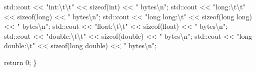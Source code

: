 \documentclass[
  letterpaper,
  DIV=11,
  numbers=noendperiod]{scrreprt}
\newenvironment{Shaded}{\begin{snugshade}}{\end{snugshade}}
\newcommand{\DecValTok}[1]{\textcolor[rgb]{0.68,0.00,0.00}{#1}}
\newcommand{\ErrorTok}[1]{\textcolor[rgb]{0.68,0.00,0.00}{#1}}
\newcommand{\FunctionTok}[1]{\textcolor[rgb]{0.28,0.35,0.67}{#1}}
\newcommand{\NormalTok}[1]{\textcolor[rgb]{0.00,0.23,0.31}{#1}}
\newcommand{\SpecialCharTok}[1]{\textcolor[rgb]{0.37,0.37,0.37}{#1}}
\newcommand{\StringTok}[1]{\textcolor[rgb]{0.13,0.47,0.30}{#1}}
\begin{document}
\begin{Shaded}
\begin{Highlighting}[]
\NormalTok{    std}\SpecialCharTok{::}\NormalTok{cout }\SpecialCharTok{\textless{}}\ErrorTok{\textless{}} \StringTok{"int:}\SpecialCharTok{\textbackslash{}t\textbackslash{}t}\StringTok{"} \SpecialCharTok{\textless{}}\ErrorTok{\textless{}} \FunctionTok{sizeof}\NormalTok{(int) }\SpecialCharTok{\textless{}}\ErrorTok{\textless{}} \StringTok{" bytes}\SpecialCharTok{\textbackslash{}n}\StringTok{"}\NormalTok{;}
\NormalTok{    std}\SpecialCharTok{::}\NormalTok{cout }\SpecialCharTok{\textless{}}\ErrorTok{\textless{}} \StringTok{"long:}\SpecialCharTok{\textbackslash{}t\textbackslash{}t}\StringTok{"} \SpecialCharTok{\textless{}}\ErrorTok{\textless{}} \FunctionTok{sizeof}\NormalTok{(long) }\SpecialCharTok{\textless{}}\ErrorTok{\textless{}} \StringTok{" bytes}\SpecialCharTok{\textbackslash{}n}\StringTok{"}\NormalTok{;}
\NormalTok{    std}\SpecialCharTok{::}\NormalTok{cout }\SpecialCharTok{\textless{}}\ErrorTok{\textless{}} \StringTok{"long long:}\SpecialCharTok{\textbackslash{}t}\StringTok{"} \SpecialCharTok{\textless{}}\ErrorTok{\textless{}} \FunctionTok{sizeof}\NormalTok{(long long) }\SpecialCharTok{\textless{}}\ErrorTok{\textless{}} \StringTok{" bytes}\SpecialCharTok{\textbackslash{}n}\StringTok{"}\NormalTok{;}
\NormalTok{    std}\SpecialCharTok{::}\NormalTok{cout }\SpecialCharTok{\textless{}}\ErrorTok{\textless{}} \StringTok{"float:}\SpecialCharTok{\textbackslash{}t\textbackslash{}t}\StringTok{"} \SpecialCharTok{\textless{}}\ErrorTok{\textless{}} \FunctionTok{sizeof}\NormalTok{(float) }\SpecialCharTok{\textless{}}\ErrorTok{\textless{}} \StringTok{" bytes}\SpecialCharTok{\textbackslash{}n}\StringTok{"}\NormalTok{;}
\NormalTok{    std}\SpecialCharTok{::}\NormalTok{cout }\SpecialCharTok{\textless{}}\ErrorTok{\textless{}} \StringTok{"double:}\SpecialCharTok{\textbackslash{}t\textbackslash{}t}\StringTok{"} \SpecialCharTok{\textless{}}\ErrorTok{\textless{}} \FunctionTok{sizeof}\NormalTok{(double) }\SpecialCharTok{\textless{}}\ErrorTok{\textless{}} \StringTok{" bytes}\SpecialCharTok{\textbackslash{}n}\StringTok{"}\NormalTok{;}
\NormalTok{    std}\SpecialCharTok{::}\NormalTok{cout }\SpecialCharTok{\textless{}}\ErrorTok{\textless{}} \StringTok{"long double:}\SpecialCharTok{\textbackslash{}t}\StringTok{"} \SpecialCharTok{\textless{}}\ErrorTok{\textless{}} \FunctionTok{sizeof}\NormalTok{(long double) }\SpecialCharTok{\textless{}}\ErrorTok{\textless{}} \StringTok{" bytes}\SpecialCharTok{\textbackslash{}n}\StringTok{"}\NormalTok{;}

\NormalTok{    return }\DecValTok{0}\NormalTok{;}
\NormalTok{\}}
\end{Highlighting}
\end{Shaded}
\end{document}
